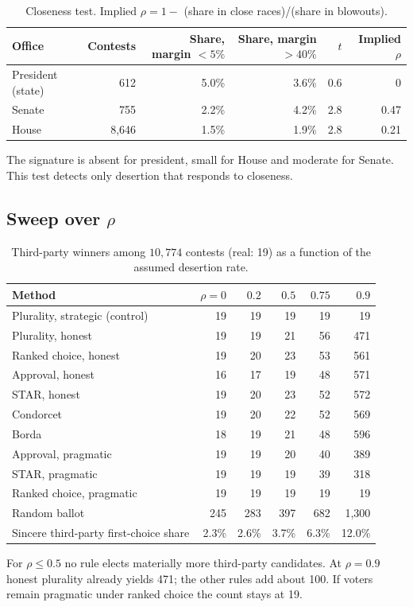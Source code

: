 \documentclass[11pt]{article}
\begin{document}
\begin{table}[H]\centering\small
\caption{Closeness test. Implied $\rho = 1-$ (share in close races)/(share in blowouts).}
\begin{tabular}{lrrrrr}
\toprule
Office & Contests & Share, margin $<5\%$ & Share, margin $>40\%$ & $t$ & Implied $\rho$ \\
\midrule
President (state) & 612 & 5.0\% & 3.6\% & 0.6 & 0 \\
Senate & 755 & 2.2\% & 4.2\% & 2.8 & 0.47 \\
House & 8{,}646 & 1.5\% & 1.9\% & 2.8 & 0.21 \\
\bottomrule
\end{tabular}
\end{table}
The signature is absent for president, small for House and moderate for Senate. This test detects only desertion that responds to closeness.

\FloatBarrier
\subsection{Sweep over $\rho$}
\begin{table}[H]\centering
\caption{Third-party winners among $10{,}774$ contests (real: 19) as a function of the assumed desertion rate.}
\begin{tabular}{lrrrrr}
\toprule
Method & $\rho=0$ & $0.2$ & $0.5$ & $0.75$ & $0.9$ \\
\midrule
Plurality, strategic (control) & 19 & 19 & 19 & 19 & 19 \\
Plurality, honest & 19 & 19 & 21 & 56 & 471 \\
Ranked choice, honest & 19 & 20 & 23 & 53 & 561 \\
Approval, honest & 16 & 17 & 19 & 48 & 571 \\
STAR, honest & 19 & 20 & 23 & 52 & 572 \\
Condorcet & 19 & 20 & 22 & 52 & 569 \\
Borda & 18 & 19 & 21 & 48 & 596 \\
Approval, pragmatic & 19 & 19 & 20 & 40 & 389 \\
STAR, pragmatic & 19 & 19 & 19 & 39 & 318 \\
Ranked choice, pragmatic & 19 & 19 & 19 & 19 & 19 \\
Random ballot & 245 & 283 & 397 & 682 & 1{,}300 \\
\midrule
Sincere third-party first-choice share & 2.3\% & 2.6\% & 3.7\% & 6.3\% & 12.0\% \\
\bottomrule
\end{tabular}
\end{table}
For $\rho\le0.5$ no rule elects materially more third-party candidates. At $\rho=0.9$ honest plurality already yields 471; the other rules add about 100. If voters remain pragmatic under ranked choice the count stays at 19.
\end{document}
